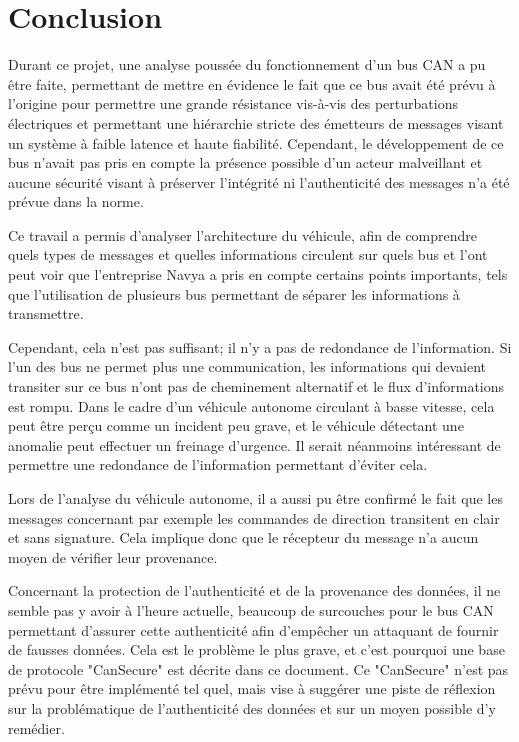 \chapter{Conclusion}

Durant ce projet, une analyse poussée du fonctionnement d'un bus CAN a pu être faite, permettant de mettre en évidence le fait que ce bus avait été prévu à l'origine pour permettre une grande résistance vis-à-vis des perturbations électriques et permettant une hiérarchie stricte des émetteurs de messages visant un système à faible latence et haute fiabilité. Cependant, le développement de ce bus n'avait pas pris en compte la présence possible d'un acteur malveillant et aucune sécurité visant à préserver l'intégrité ni l'authenticité des messages n'a été prévue dans la norme.

Ce travail a permis d'analyser l'architecture du véhicule, afin de comprendre quels types de messages et quelles informations circulent sur quels bus et l'ont peut voir que l'entreprise Navya a pris en compte certains points importants, tels que l'utilisation de plusieurs bus permettant de séparer les informations à transmettre.

Cependant, cela n'est pas suffisant; il n'y a pas de redondance de l'information. Si l'un des bus ne permet plus une communication, les informations qui devaient transiter sur ce bus n'ont pas de cheminement alternatif et le flux d'informations est rompu. Dans le cadre d'un véhicule autonome circulant à basse vitesse, cela peut être perçu comme un incident peu grave, et le véhicule détectant une anomalie peut effectuer un freinage d'urgence. Il serait néanmoins intéressant de permettre une redondance de l'information permettant d'éviter cela.

Lors de l'analyse du véhicule autonome, il a aussi pu être confirmé le fait que les messages concernant par exemple les commandes de direction transitent en clair et sans signature.
Cela implique donc que le récepteur du message n'a aucun moyen de vérifier leur provenance.

Concernant la protection de l'authenticité et de la provenance des données, il ne semble pas y avoir à l'heure actuelle, beaucoup de surcouches pour le bus CAN permettant d'assurer cette authenticité afin d'empêcher un attaquant de fournir de fausses données. Cela est le problème le plus grave, et c'est pourquoi une base de protocole "CanSecure" est décrite dans ce document. Ce "CanSecure" n'est pas prévu pour être implémenté tel quel, mais vise à suggérer une piste de réflexion sur la problématique de l'authenticité des données et sur un moyen possible d'y remédier.